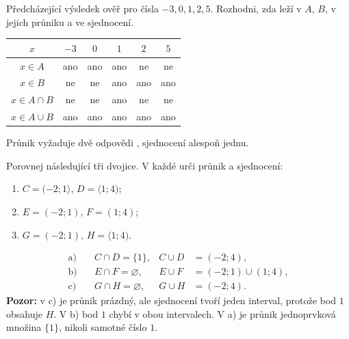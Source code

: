 \documentclass[11pt,a4paper]{article}
\newcommand{\plny}[2]{\fill[black] (#1,#2) circle (2.65pt);}
\newcommand{\prazdny}[2]{\draw[thick,fill=white] (#1,#2) circle (2.65pt);}
\newcommand{\pruh}[3]{\draw[line width=1.55pt] (#1,#3)--(#2,#3);}
\newcommand{\osacisla}[2]{%
  \draw[-{Latex[length=2mm]},thin] (#1-.36,0)--(#2+.45,0) node[right] {$x$};%
  \foreach \t in {#1,...,#2}{\draw (\t,.075)--(\t,-.075) node[below=3pt,font=\scriptsize] {$\t$};}%
}
\begin{document}
\begin{zadaniReseniBox}[title={Rozšíření 1},breakable=false]
Předcházející výsledek ověř pro čísla $-3,0,1,2,5$.
Rozhodni, zda leží v $A$, $B$, v jejich průniku a ve sjednocení.
\tcblower
\begin{center}
\begin{tabular}{c|ccccc}
\toprule
$x$ & $-3$ & $0$ & $1$ & $2$ & $5$\\\midrule
$x\in A$ & ano & ano & ano & ne & ne\\
$x\in B$ & ne & ne & ano & ano & ano\\
$x\in A\cap B$ & ne & ne & ano & ne & ne\\
$x\in A\cup B$ & ano & ano & ano & ano & ano\\
\bottomrule
\end{tabular}
\end{center}
Průnik vyžaduje dvě odpovědi , sjednocení alespoň jednu.
\end{zadaniReseniBox}

\begin{prikladReseniBox}[title={Příklad 2},breakable=false]
Porovnej následující tři dvojice. V každé urči průnik a sjednocení:
\begin{enumerate}[label=\alph*)]
\item $C=(-2;1\rangle$, $D=\langle1;4)$;
\item $E=(-2;1)$, $F=(1;4)$;
\item $G=(-2;1)$, $H=\langle1;4)$.
\end{enumerate}
\tcblower
\begin{center}
\end{center}
\begin{align*}
\text{a)}\quad &C\cap D=\{1\}, & C\cup D&=(-2;4),\\
\text{b)}\quad &E\cap F=\varnothing, & E\cup F&=(-2;1)\cup(1;4),\\
\text{c)}\quad &G\cap H=\varnothing, & G\cup H&=(-2;4).
\end{align*}
\textbf{Pozor:} v c) je průnik prázdný, ale sjednocení tvoří jeden interval,
protože bod $1$ obsahuje $H$. V b) bod $1$ chybí v obou intervalech.
V a) je průnik jednoprvková množina $\{1\}$, nikoli samotné číslo $1$.
\end{prikladReseniBox}
\end{document}
